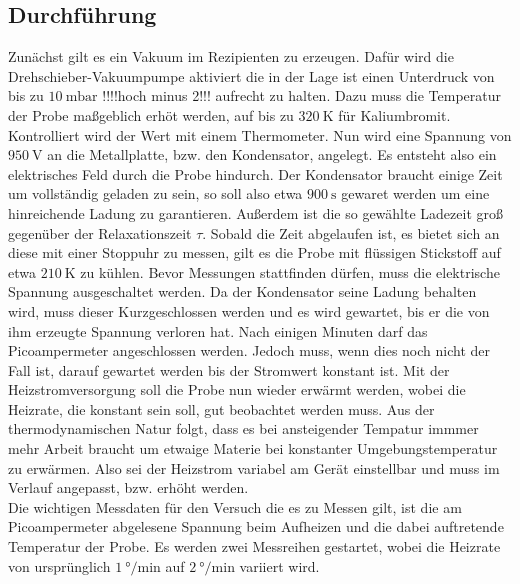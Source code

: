 \subsection{Durchführung}
Zunächst gilt es ein Vakuum im Rezipienten zu erzeugen. Dafür wird die Drehschieber-Vakuumpumpe
aktiviert die in der Lage ist einen Unterdruck von bis zu $\SI{10}{\milli\bar}$ !!!!hoch minus 2!!! aufrecht zu halten.
Dazu muss die Temperatur der Probe maßgeblich erhöt werden, auf bis zu $\SI{320}{\kelvin}$ für Kaliumbromit. Kontrolliert wird der Wert mit einem Thermometer.
Nun wird eine Spannung von $\SI{950}{\volt}$ an die Metallplatte, bzw. den Kondensator, angelegt. Es entsteht also ein elektrisches 
Feld durch die Probe hindurch. Der Kondensator braucht einige Zeit um vollständig geladen zu sein,
so soll also etwa $\SI{900}{\second}$ gewaret werden um eine hinreichende Ladung zu garantieren.
Außerdem ist die so gewählte Ladezeit groß gegenüber der Relaxationszeit $\tau$.
Sobald die Zeit abgelaufen ist, es bietet sich an diese mit einer Stoppuhr zu messen,
gilt es die Probe mit flüssigen Stickstoff auf etwa $\SI{210}{\kelvin}$ zu kühlen.
Bevor Messungen stattfinden dürfen, muss die elektrische Spannung ausgeschaltet werden.
Da der Kondensator seine Ladung behalten wird,
muss dieser Kurzgeschlossen werden und es wird gewartet, bis er die von ihm erzeugte Spannung verloren hat.
Nach einigen Minuten darf das Picoampermeter angeschlossen werden. Jedoch muss,
wenn dies noch nicht der Fall ist, darauf gewartet werden bis der Stromwert konstant ist.
Mit der Heizstromversorgung soll die Probe nun wieder erwärmt werden, wobei die 
Heizrate, die konstant sein soll, gut beobachtet werden muss. Aus der thermodynamischen Natur 
folgt, dass es bei ansteigender Tempatur immmer mehr Arbeit braucht um etwaige Materie bei 
konstanter Umgebungstemperatur zu erwärmen. Also sei der Heizstrom variabel am Gerät
einstellbar und muss im Verlauf angepasst, bzw. erhöht werden.
\\
\newline
Die wichtigen Messdaten für den Versuch die es zu Messen gilt, ist die am Picoampermeter 
abgelesene Spannung beim Aufheizen und die dabei auftretende Temperatur der Probe.
Es werden zwei Messreihen gestartet, wobei die Heizrate von ursprünglich $\SI{1}{\degree\per\minute}$
auf $\SI{2}{\degree\per\minute}$ variiert wird.